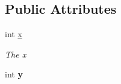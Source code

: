 \subsection*{Public Attributes}
\begin{DoxyCompactItemize}
\item 
int \hyperlink{struct_lerp2_a_p_i_1_1_optimizers_1_1_point_a43880eb415c1aa7d86bcd1bc7d4951ee}{x}
\begin{DoxyCompactList}\small\item\em The x \end{DoxyCompactList}\item 
\mbox{\label{struct_lerp2_a_p_i_1_1_optimizers_1_1_point_ac210e3c3b17b4139d61af614570b881c}} 
int {\bfseries y}
\end{DoxyCompactItemize}
